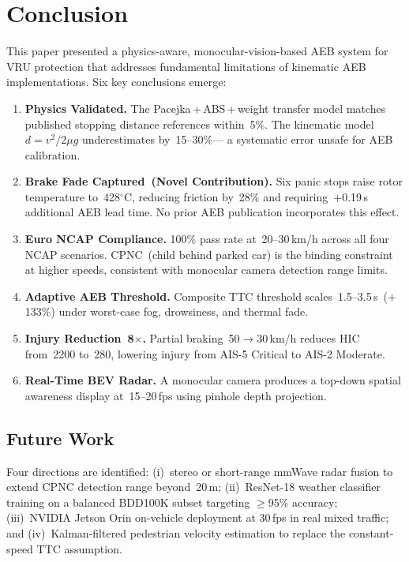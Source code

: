\documentclass[journal]{IEEEtran}
\begin{document}
\section{Conclusion}
\label{sec:conclusion}

This paper presented a physics-aware, monocular-vision-based AEB system
for VRU protection that addresses fundamental limitations of kinematic
AEB implementations.
Six key conclusions emerge:

\begin{enumerate}
  \item \textbf{Physics Validated.} The Pacejka\,+\,ABS\,+\,weight
        transfer model matches published stopping distance references
        within~5\%.
        The kinematic model $d=v^2/2\mu g$ underestimates by~15--30\%---
        a systematic error unsafe for AEB calibration.

  \item \textbf{Brake Fade Captured~(Novel Contribution).}
        Six panic stops raise rotor temperature to~428$^\circ$C,
        reducing friction by~28\% and requiring~$+$0.19\,s additional
        AEB lead time.
        No prior AEB publication incorporates this effect.

  \item \textbf{Euro NCAP Compliance.}
        100\% pass rate at~20--30\,km/h across all four NCAP scenarios.
        CPNC~(child behind parked car) is the binding constraint at
        higher speeds, consistent with monocular camera detection range
        limits.

  \item \textbf{Adaptive AEB Threshold.}
        Composite TTC threshold scales~1.5--3.5\,s~($+$133\%) under
        worst-case fog, drowsiness, and thermal fade.

  \item \textbf{Injury Reduction~8$\times$.}
        Partial braking~50$\to$30\,km/h reduces HIC from~2200 to~280,
        lowering injury from AIS-5 Critical to AIS-2 Moderate.

  \item \textbf{Real-Time BEV Radar.}
        A monocular camera produces a top-down spatial awareness display
        at~15--20\,fps using pinhole depth projection.
\end{enumerate}

\subsection*{Future Work}
Four directions are identified: (i)~stereo or short-range mmWave radar
fusion to extend CPNC detection range beyond~20\,m; (ii)~ResNet-18
weather classifier training on a balanced BDD100K subset targeting
$\ge$95\% accuracy; (iii)~NVIDIA Jetson Orin on-vehicle deployment
at 30\,fps in real mixed traffic; and (iv)~Kalman-filtered pedestrian
velocity estimation to replace the constant-speed TTC assumption.
\end{document}
